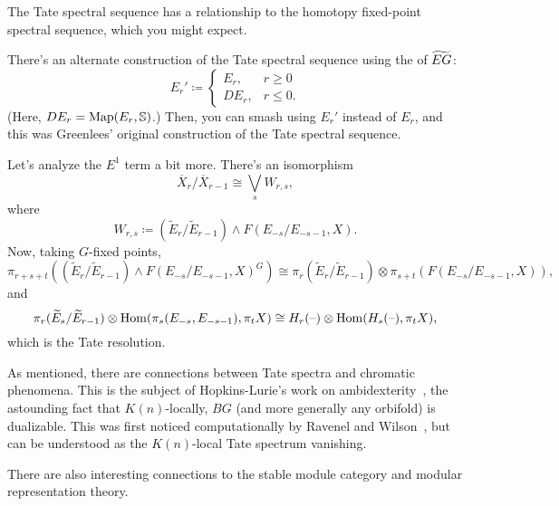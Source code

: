 The Tate spectral sequence has a relationship to the homotopy fixed-point spectral sequence, which you might
expect.

There's an alternate construction of the Tate spectral sequence using the  of $\widetilde{EG}$:
\[E_r'\coloneqq \begin{cases}
	E_r, &r\ge 0\\
	DE_r, &r\le 0.
\end{cases}\]
(Here, $DE_r = \operatorname{Map}(E_r, \mathbb S)$.) Then, you can smash using $E_r'$ instead of $E_r$, and this was Greenlees'
original construction of the Tate spectral sequence.

Let's analyze the $E^1$ term a bit more. There's an isomorphism
\[\overline X_r/\overline X_{r-1}\cong\bigvee_s W_{r,s},\]
where
\[W_{r,s}\coloneqq (\widetilde E_r/\widetilde E_{r-1})\wedge F(E_{-s}/E_{-s-1}, X).\]
Now, taking $G$-fixed points,
\[\pi_{r+s+t}((\widetilde E_r/\widetilde E_{r-1})\wedge F(E_{-s}/E_{-s-1}, X)^G)\cong \pi_r(\widetilde
E_r/\widetilde E_{r-1})\otimes \pi_{s+t}(F(E_{-s}/E_{-s-1}, X)),\]
and
\[\pi_r(\widetilde E_s/\widetilde E_{r-1})\otimes\operatorname{Hom}(\pi_s(E_{-s}, E_{-s-1}), \pi_tX)\cong
H_r(\text{--})\otimes\operatorname{Hom}(H_s(\text{--}), \pi_tX),\]
which is the Tate resolution.
\begin{rem}
As mentioned, there are connections between Tate spectra and chromatic phenomena. This is the subject of
Hopkins-Lurie's work on ambidexterity~\cite{Ambidexterity}, the astounding fact that $K(n)$-locally, $\mathit{BG}$
(and more generally any orbifold) is dualizable. This was first noticed computationally by Ravenel and
Wilson~\cite{RavenelWilson}, but can be understood as the $K(n)$-local Tate spectrum vanishing.

There are also interesting connections to the stable module category and modular representation theory.
\end{rem}
